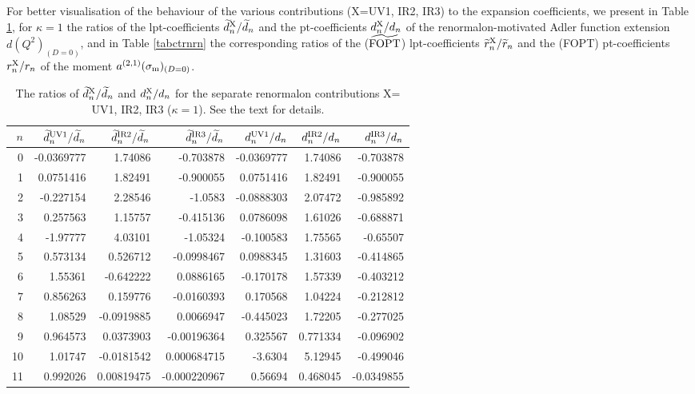 \documentclass[aps,nofootinbib,showkeys,noshowpacs,preprintnumbers,amsmath,amssymb]{revtex4}
\newcommand{\sm}{{\sigma_{\rm m}}}
\newcommand{\td}{{\widetilde d}}
\newcommand{\tr}{{\widetilde r}}
\begin{document}
For better visualisation of the behaviour of the various contributions (X=UV1, IR2, IR3) to the expansion coefficients, we present in Table \ref{tabctdndn}, for $\kappa=1$ the ratios of the lpt-coefficients $\td_n^{\rm X}/\td_n$ and the pt-coefficients $d_n^{\rm X}/d_n$ of the renormalon-motivated Adler function extension $d(Q^2)_{(D=0)}$, and in Table \ref{tabctrnrn} the corresponding ratios of the ($\widetilde{\rm FOPT}$) lpt-coefficients $\tr_n^{\rm X}/\tr_n$ and the (FOPT) pt-coefficients $r_n^{\rm X}/r_n$ of the moment $a^{(2,1)}(\sm)_{(D=0)}$.
\begin{table}
  \caption{The ratios of $\td_n^{\rm X}/\td_n$ and $d_n^{\rm X}/d_n$ for the separate renormalon contributions X= UV1, IR2, IR3 ($\kappa=1$). See the text for details.}
\label{tabctdndn}
\begin{ruledtabular}
\begin{tabular}{r|rrr|rrr}
  $n$ & $\td_n^{\rm UV1}/\td_n$ &  $\td_n^{\rm IR2}/\td_n$ &  $\td_n^{\rm IR3}/\td_n$ &
 $d_n^{\rm UV1}/d_n$ &  $d_n^{\rm IR2}/d_n$ &  $d_n^{\rm IR3}/d_n$   
\\
\hline
0       &  -0.0369777  & 1.74086     &   -0.703878   & -0.0369777 & 1.74086 & -0.703878 \\
1       &  0.0751416   & 1.82491     &  -0.900055  & 0.0751416 & 1.82491 & -0.900055 \\
2       &  -0.227154 & 2.28546 &  -1.0583  &  -0.0888303 & 2.07472 & -0.985892 \\
3       &  0.257563 & 1.15757 &  -0.415136  & 0.0786098 & 1.61026 & -0.688871 \\
4       &  -1.97777 & 4.03101 &  -1.05324  & -0.100583 & 1.75565 & -0.65507 \\
5       &  0.573134 & 0.526712 & -0.0998467 & 0.0988345 & 1.31603 & -0.414865 \\
6       &  1.55361 & -0.642222 & 0.0886165 & -0.170178 & 1.57339 & -0.403212 \\
7       & 0.856263 & 0.159776 & -0.0160393 & 0.170568 & 1.04224 & -0.212812 \\
8       & 1.08529 & -0.0919885 &  0.0066947  & -0.445023 & 1.72205 & -0.277025 \\
9       & 0.964573 & 0.0373903 & -0.00196364 & 0.325567 & 0.771334 & -0.096902 \\
10      & 1.01747 & -0.0181542 & 0.000684715 & -3.6304 & 5.12945 & -0.499046 \\
11      & 0.992026 & 0.00819475 & -0.000220967 & 0.56694 & 0.468045 & -0.0349855 \\

\end{tabular}
\end{ruledtabular}
\end{table}
\end{document}

